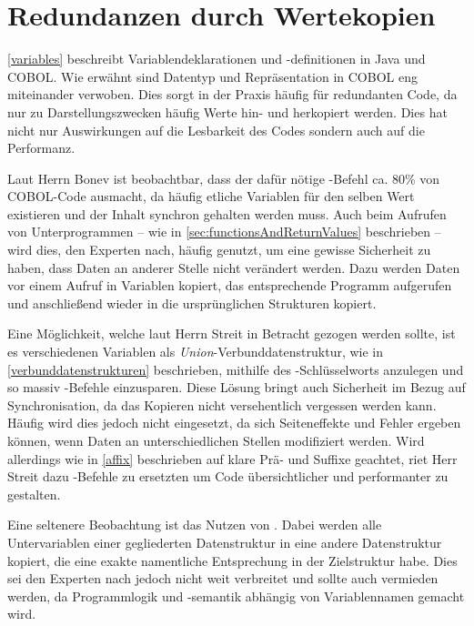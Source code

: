 \section{Redundanzen durch Wertekopien}
\autoref{variables} beschreibt Variablendeklarationen und -definitionen in Java und COBOL. Wie erwähnt sind Datentyp und Repräsentation in COBOL eng miteinander verwoben. Dies sorgt in der Praxis häufig für redundanten Code, da nur zu Darstellungszwecken häufig Werte hin- und herkopiert werden. Dies hat nicht nur Auswirkungen auf die Lesbarkeit des Codes sondern auch auf die Performanz.

Laut Herrn Bonev ist beobachtbar, dass der dafür nötige -Befehl ca. 80\% von COBOL-Code ausmacht, da häufig etliche Variablen für den selben Wert existieren und der Inhalt synchron gehalten werden muss. Auch beim Aufrufen von Unterprogrammen -- wie in \autoref{sec:functionsAndReturnValues} beschrieben -- wird dies, den Experten nach, häufig genutzt, um eine gewisse Sicherheit zu haben, dass Daten an anderer Stelle nicht verändert werden. Dazu werden Daten vor einem Aufruf in Variablen kopiert, das entsprechende Programm aufgerufen und anschließend wieder in die ursprünglichen Strukturen kopiert. 

Eine Möglichkeit, welche laut Herrn Streit in Betracht gezogen werden sollte, ist es verschiedenen Variablen als \textit{Union}-Verbunddatenstruktur, wie in \autoref{verbunddatenstrukturen} beschrieben, mithilfe des -Schlüsselworts anzulegen und so massiv -Befehle einzusparen. Diese Lösung bringt auch Sicherheit im Bezug auf Synchronisation, da das Kopieren nicht versehentlich vergessen werden kann. Häufig wird dies jedoch nicht eingesetzt, da sich Seiteneffekte und Fehler ergeben können, wenn Daten an unterschiedlichen Stellen modifiziert werden. Wird allerdings wie in \autoref{affix} beschrieben auf klare Prä- und Suffixe geachtet, riet Herr Streit dazu -Befehle zu ersetzten um Code übersichtlicher und performanter zu gestalten.

Eine seltenere Beobachtung ist das Nutzen von . Dabei werden alle Untervariablen einer gegliederten Datenstruktur in eine andere Datenstruktur kopiert, die eine exakte namentliche Entsprechung in der Zielstruktur habe. Dies sei den Experten nach jedoch nicht weit verbreitet und sollte auch vermieden werden, da Programmlogik und -semantik abhängig von Variablennamen gemacht wird.